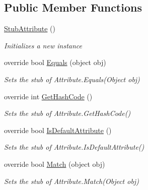 \subsection*{Public Member Functions}
\begin{DoxyCompactItemize}
\item 
\hyperlink{class_system_1_1_fakes_1_1_stub_attribute_aaf64c21d35b3155b8846502b97f69824}{Stub\-Attribute} ()
\begin{DoxyCompactList}\small\item\em Initializes a new instance\end{DoxyCompactList}\item 
override bool \hyperlink{class_system_1_1_fakes_1_1_stub_attribute_ad55f0d5a08d47e0a715cd158ee3d7c2a}{Equals} (object obj)
\begin{DoxyCompactList}\small\item\em Sets the stub of Attribute.\-Equals(\-Object obj)\end{DoxyCompactList}\item 
override int \hyperlink{class_system_1_1_fakes_1_1_stub_attribute_a93826a03219f5db5638c9d95803bbbe4}{Get\-Hash\-Code} ()
\begin{DoxyCompactList}\small\item\em Sets the stub of Attribute.\-Get\-Hash\-Code()\end{DoxyCompactList}\item 
override bool \hyperlink{class_system_1_1_fakes_1_1_stub_attribute_aa2ac6388a82a651a9b5c31fe0143e7f4}{Is\-Default\-Attribute} ()
\begin{DoxyCompactList}\small\item\em Sets the stub of Attribute.\-Is\-Default\-Attribute()\end{DoxyCompactList}\item 
override bool \hyperlink{class_system_1_1_fakes_1_1_stub_attribute_a2d106dd2b15f20f528583607cb5af294}{Match} (object obj)
\begin{DoxyCompactList}\small\item\em Sets the stub of Attribute.\-Match(\-Object obj)\end{DoxyCompactList}\end{DoxyCompactItemize}
